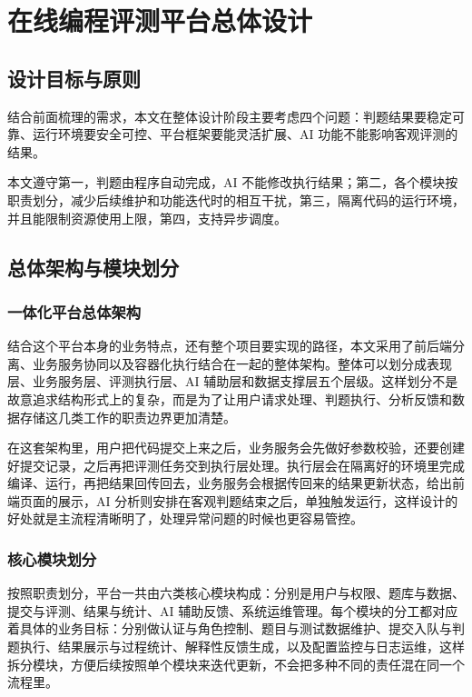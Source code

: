 \chapter{在线编程评测平台总体设计}

\section{设计目标与原则}

结合前面梳理的需求，本文在整体设计阶段主要考虑四个问题：判题结果要稳定可靠、运行环境要安全可控、平台框架要能灵活扩展、AI 功能不能影响客观评测的结果。

本文遵守第一，判题由程序自动完成，AI 不能修改执行结果；第二，各个模块按职责划分，减少后续维护和功能迭代时的相互干扰，第三，隔离代码的运行环境，并且能限制资源使用上限，第四，支持异步调度。

\section{总体架构与模块划分}

\subsection{一体化平台总体架构}

结合这个平台本身的业务特点，还有整个项目要实现的路径，本文采用了前后端分离、业务服务协同以及容器化执行结合在一起的整体架构。整体可以划分成表现层、业务服务层、评测执行层、AI 辅助层和数据支撑层五个层级。这样划分不是故意追求结构形式上的复杂，而是为了让用户请求处理、判题执行、分析反馈和数据存储这几类工作的职责边界更加清楚。

在这套架构里，用户把代码提交上来之后，业务服务会先做好参数校验，还要创建好提交记录，之后再把评测任务交到执行层处理。执行层会在隔离好的环境里完成编译、运行，再把结果回传回去，业务服务会根据传回来的结果更新状态，给出前端页面的展示，AI 分析则安排在客观判题结束之后，单独触发运行，这样设计的好处就是主流程清晰明了，处理异常问题的时候也更容易管控。

\subsection{核心模块划分}

按照职责划分，平台一共由六类核心模块构成：分别是用户与权限、题库与数据、提交与评测、结果与统计、AI 辅助反馈、系统运维管理。每个模块的分工都对应着具体的业务目标：分别做认证与角色控制、题目与测试数据维护、提交入队与判题执行、结果展示与过程统计、解释性反馈生成，以及配置监控与日志运维，这样拆分模块，方便后续按照单个模块来迭代更新，不会把多种不同的责任混在同一个流程里。

